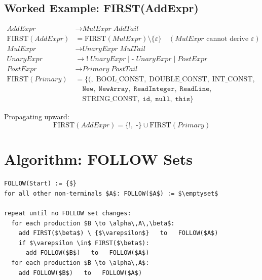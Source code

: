 \documentclass[12pt,a4paper]{article}
\begin{document}
\subsection{Worked Example: FIRST(AddExpr)}

\begin{align*}
  \textit{AddExpr} &\to \textit{MulExpr}\;\textit{AddTail}\\
  \text{FIRST}(\textit{AddExpr}) &= \text{FIRST}(\textit{MulExpr}) \setminus \{\varepsilon\}
    \quad (\textit{MulExpr} \text{ cannot derive } \varepsilon)\\
  \textit{MulExpr} &\to \textit{UnaryExpr}\;\textit{MulTail}\\
  \textit{UnaryExpr} &\to \texttt{!}\;\textit{UnaryExpr}
                        \mid \texttt{-}\;\textit{UnaryExpr}
                        \mid \textit{PostExpr}\\
  \textit{PostExpr} &\to \textit{Primary}\;\textit{PostTail}\\
  \text{FIRST}(\textit{Primary}) &= \{
    \texttt{(},\; \text{BOOL\_CONST},\; \text{DOUBLE\_CONST},\; \text{INT\_CONST},\\
    &\quad \texttt{New},\; \texttt{NewArray},\; \texttt{ReadInteger},\; \texttt{ReadLine},\\
    &\quad \text{STRING\_CONST},\; \texttt{id},\; \texttt{null},\; \texttt{this}
  \}
\end{align*}

Propagating upward:
\[
  \text{FIRST}(\textit{AddExpr}) = \{\texttt{!},\; \texttt{-}\}
    \cup \text{FIRST}(\textit{Primary})
\]

\section{Algorithm: FOLLOW Sets}

\begin{lstlisting}[style=pseudo]
FOLLOW(Start) := {$}
for all other non-terminals $A$: FOLLOW($A$) := $\emptyset$

repeat until no FOLLOW set changes:
  for each production $B \to \alpha\,A\,\beta$:
    add FIRST($\beta$) \ {$\varepsilon$}   to   FOLLOW($A$)
    if $\varepsilon \in$ FIRST($\beta$):
      add FOLLOW($B$)   to   FOLLOW($A$)
  for each production $B \to \alpha\,A$:
    add FOLLOW($B$)   to   FOLLOW($A$)
\end{lstlisting}
\end{document}
